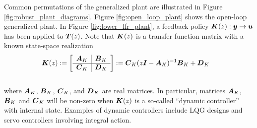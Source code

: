 Common permutations of the generalized plant are illustrated in Figure \ref{fig:robust_plant_diagrams}.  Figure \ref{fig:open_loop_plant} shows the open-loop generalized plant.  In Figure \ref{fig:lower_lfr_plant}, a feedback policy $\vb*{K}(z): \vb*{y} \rightarrow \vb*{u}$ has been applied to $\vb*{T}(z)$.  Note that $\vb*{K}(z)$ is a transfer function matrix with a known state-space realization \vspace{5pt}
\begin{equation}
\label{eq:dynamic_controller_K_z}
\begin{aligned}
	\vb*{K}(z) &:=
	\begin{bmatrix}
	\begin{array}{c|cc}
		\vb*{A}_{K} & \vb*{B}_{K}\\
		\hline
		\vb*{C}_{K} & \vb*{D}_{K}\\
	\end{array}
	\end{bmatrix} := \vb*{C}_{K}(z\vb*{I} - \vb*{A}_{K})^{-1}\vb*{B}_{K} + \vb*{D}_{K}
\end{aligned}
\vspace{-15pt}
\end{equation}\\
where $\vb*{A}_{K}$, $\vb*{B}_{K}$, $\vb*{C}_{K}$, and $\vb*{D}_{K}$ are real matrices.  In particular, matrices $\vb*{A}_{K}$, $\vb*{B}_{K}$ and $\vb*{C}_{K}$ will be non-zero when $\vb*{K}(z)$ is a so-called ``dynamic controller'' with internal state.  Examples of dynamic controllers include LQG designs and servo controllers involving integral action.


